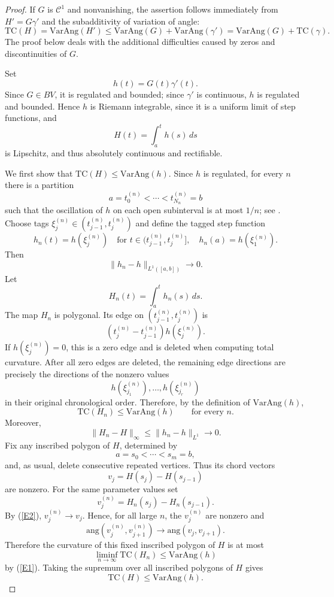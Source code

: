 \documentclass[reqno]{amsart}
\theoremstyle{definition}
\newcommand{\ang}{\mathrm{ang}}
\newcommand{\T}{\mathrm{TC}}
\newcommand{\VA}{\mathrm{VarAng}}
\newcommand{\cC}{\mathcal{C}}
\numberwithin{equation}{section}
\begin{document}
\begin{proof} If $G$ is $\cC^1$ and nonvanishing, the assertion follows immediately from $H'=G\gamma'$ and the subadditivity of variation of angle:
\[\T(H)=\VA(H')\le \VA(G)+\VA(\gamma')=\VA(G)+\T(\gamma).\]
The proof below deals with the additional difficulties caused by zeros
and discontinuities of $G$.

Set
\[
h(t)=G(t)\gamma'(t).
\]
Since $G\in BV$, it is regulated and bounded; since $\gamma'$ is continuous, $h$ is regulated and bounded. Hence $h$ is Riemann integrable, since it is a uniform limit of step functions, and
\[H(t)=\int_a^t h(s)\,ds\]
is Lipschitz, and thus absolutely continuous and rectifiable.

We first show that  $\T(H)\le \VA(h)$. Since $h$ is regulated, for every $n$ there is a partition
\[
a=t_0^{(n)}<\cdots<t_{N_n}^{(n)}=b
\]
such that the oscillation of $h$ on each open subinterval is at most $1/n$; see \cite{F}. Choose tags
$\xi_j^{(n)}\in(t_{j-1}^{(n)},t_j^{(n)})$ and define the tagged step function
\[h_n(t)=h(\xi_j^{(n)})
\quad\text{for }t\in(t_{j-1}^{(n)},t_j^{(n)}],\quad h_n(a)=h(\xi_1^{(n)}).\]
Then
\[\|h_n-h\|_{L^1([a,b])}\longrightarrow 0.\]
Let
\[
H_n(t)=\int_a^t h_n(s)\,ds.
\]
The map $H_n$ is polygonal. Its edge on $(t_{j-1}^{(n)},t_j^{(n)})$ is
\[
\left(t_j^{(n)}-t_{j-1}^{(n)}\right)h(\xi_j^{(n)}).
\]
If $h(\xi_j^{(n)})=0$, this is a zero edge and is deleted when computing total curvature. After all zero edges are deleted, the remaining edge directions are precisely the directions of the nonzero values
\[
h(\xi_{j_1}^{(n)}),\ldots,h(\xi_{j_r}^{(n)})
\]
in their original chronological order. Therefore, by the definition of $\VA(h)$,
\begin{equation}\label{E1}\T(H_n)\le \VA(h)
\qquad\text{for every }n.\end{equation}
Moreover,
\begin{equation}\label{E2}\|H_n-H\|_\infty \le \|h_n-h\|_{L^1}\longrightarrow0.\end{equation}
Fix any inscribed polygon of $H$, determined by
\[a= s_0<\cdots<s_m= b,\] and, as usual, delete consecutive repeated vertices. Thus its chord vectors
\[v_j=H(s_j)-H(s_{j-1})\]
are nonzero. For the same parameter values set
\[v_j^{(n)}=H_n(s_j)-H_n(s_{j-1}).\]
By (\ref{E2}), $v_j^{(n)}\to v_j$. Hence, for all large $n$, the $v_j^{(n)}$ are nonzero and
\[\ang\left(v_j^{(n)},v_{j+1}^{(n)}\right)\longrightarrow \ang(v_j,v_{j+1}).
\]
Therefore the curvature of this fixed inscribed polygon of $H$ is at most
\[\liminf_{n\to\infty}\T(H_n)\le \VA(h)\]
by (\ref{E1}). Taking the supremum over all inscribed polygons of $H$ gives
\[\T(H)\le \VA(h).\]


\end{proof}
\end{document}

